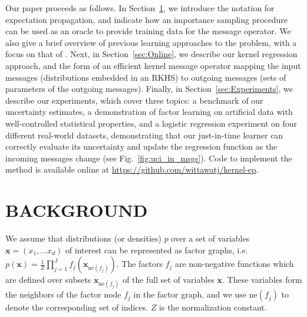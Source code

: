 \documentclass[english]{article}
\theoremstyle{plain}
\theoremstyle{plain}
\newcommand{\bx}{\mathbf{x}}				%
\newcommand{\factor}{f}				%
\newcommand{\fis}[1]{\mathrm{ne}(#1)}   	%
\newcommand{\fx}[1]{ \mathbf{x}_{\mathrm{ne}(#1)} }   	%
\newcommand{\figref}[1]{Fig.~\ref{#1}}
\newcommand{\secref}[1]{Section~\ref{#1}}
\begin{document}

Our paper proceeds as follows. In \secref{sec:EP}, we introduce the notation for expectation propagation,
and indicate how an importance sampling procedure can be used as an oracle to provide training data for the message operator.
We also give a brief overview of previous learning approaches to the problem, with a focus on
that of \citet{Eslami2014}.
Next, in \secref{sec:Online}, we describe our kernel regression approach, and
the form of an efficient kernel message operator mapping the input messages (distributions embedded in an
RKHS) to outgoing messages (sets of parameters of the outgoing messages).
Finally, in \secref{sec:Experiments}, we describe our experiments, which cover three topics:
a benchmark of our uncertainty estimates, a demonstration of factor learning
on artificial data with well-controlled statistical properties,
and a logistic regression experiment on four different real-world datasets,
demonstrating that our just-in-time learner can correctly evaluate its uncertainty
and update the regression function as the incoming messages change (see \figref{fig:uci_in_msgs}).
Code to implement the method is available online at \url{https://github.com/wittawatj/kernel-ep}.




\section{BACKGROUND}
\label{sec:EP}

We assume that distributions (or densities) $p$ over a set of variables 
$\bx = (x_1, \dots x_d)$ of interest can be represented as factor graphs, i.e.\
%
$p(\bx) = \frac{1}{Z} \prod_{j=1}^J \factor_j(\fx{\factor_j})$.
The factors $\factor_j$ are non-negative functions which are defined over subsets $\fx{\factor_j}$ of the full set of variables $\bx$. These variables form the neighbors of the factor node $\factor_j$ in the factor graph, and we use $\fis{\factor_j}$ to denote the corresponding set of indices. $Z$ is the normalization constant.
\end{document}
